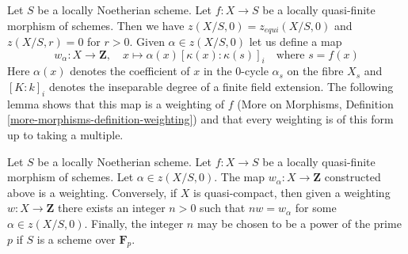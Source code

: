 \noindent
Let $S$ be a locally Noetherian scheme. Let $f : X \to S$ be a locally
quasi-finite morphism of schemes. Then we have $z(X/S, 0) = z_{equi}(X/S, 0)$
and $z(X/S, r) = 0$ for $r > 0$. Given $\alpha \in z(X/S, 0)$ let us
define a map
$$
w_\alpha : X \longrightarrow \mathbf{Z},\quad
x \mapsto \alpha(x) [\kappa(x) : \kappa(s)]_i \quad\text{where }s = f(x)
$$
Here $\alpha(x)$ denotes the coefficient of $x$ in the $0$-cycle
$\alpha_s$ on the fibre $X_s$ and $[K : k]_i$ denotes the inseparable
degree of a finite field extension.
The following lemma shows that this map is a weighting of $f$
(More on Morphisms, Definition \ref{more-morphisms-definition-weighting})
and that every weighting is of this form up to taking a multiple.

\begin{lemma}
\label{lemma-weightings}
Let $S$ be a locally Noetherian scheme. Let $f : X \to S$ be a locally
quasi-finite morphism of schemes. Let $\alpha \in z(X/S, 0)$.
The map $w_\alpha : X \to \mathbf{Z}$ constructed above is a weighting.
Conversely, if $X$ is quasi-compact, then given a weighting
$w : X \to \mathbf{Z}$ there exists an integer $n > 0$ such
that $nw = w_\alpha$ for some $\alpha \in z(X/S, 0)$. Finally, the
integer $n$ may be chosen to be a power of the prime $p$ if $S$ is a scheme
over $\mathbf{F}_p$.
\end{lemma}

